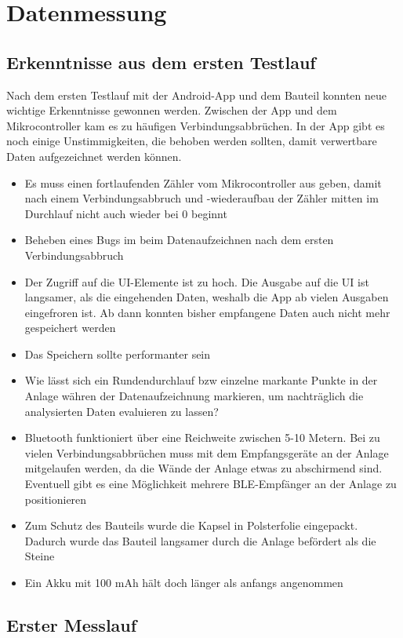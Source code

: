 \section{Datenmessung}

\subsection{Erkenntnisse aus dem ersten Testlauf}
Nach dem ersten Testlauf mit der Android-App und dem Bauteil konnten neue wichtige Erkenntnisse gewonnen werden.
Zwischen der App und dem Mikrocontroller kam es zu häufigen Verbindungsabbrüchen. In der App gibt es noch einige Unstimmigkeiten, die behoben werden sollten, damit verwertbare Daten aufgezeichnet werden können. 

\begin{itemize}
	\item Es muss einen fortlaufenden Zähler vom Mikrocontroller aus geben, damit nach einem Verbindungsabbruch und -wiederaufbau der Zähler mitten im Durchlauf nicht auch wieder bei 0 beginnt
	\item Beheben eines Bugs im beim Datenaufzeichnen nach dem ersten Verbindungsabbruch
	\item Der Zugriff auf die UI-Elemente ist zu hoch. Die Ausgabe auf die UI ist langsamer, als die eingehenden Daten, weshalb die App ab vielen Ausgaben eingefroren ist. Ab dann konnten bisher empfangene Daten auch nicht mehr gespeichert werden
	\item Das Speichern sollte performanter sein
	\item Wie lässt sich ein Rundendurchlauf bzw einzelne markante Punkte in der Anlage währen der Datenaufzeichnung markieren, um nachträglich die analysierten Daten evaluieren zu lassen?
	\item Bluetooth funktioniert über eine Reichweite zwischen 5-10 Metern. Bei zu vielen Verbindungsabbrüchen muss mit dem Empfangsgeräte an der Anlage mitgelaufen werden, da die Wände der Anlage etwas zu abschirmend sind. Eventuell gibt es eine Möglichkeit mehrere BLE-Empfänger an der Anlage zu positionieren
	\item Zum Schutz des Bauteils wurde die Kapsel in Polsterfolie eingepackt. Dadurch wurde das Bauteil langsamer durch die Anlage befördert als die Steine
	\item Ein Akku mit 100 mAh hält doch länger als anfangs angenommen
\end{itemize}

\subsection{Erster Messlauf}

